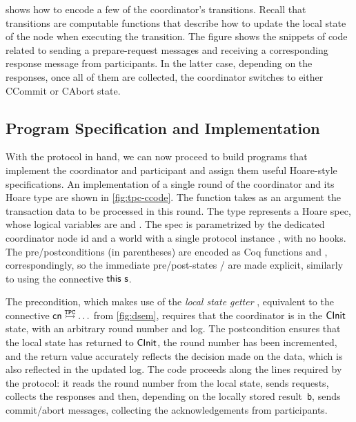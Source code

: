  shows how to encode a few of the
coordinator's transitions.
%
Recall that \disel transitions are computable functions that describe
how to update the local state of the node when executing the
transition.
%
The figure shows the snippets of \disel code related to sending a
prepare-request messages and receiving a corresponding response
message from participants.
%
In the latter case, depending on the responses, once all of them are
collected, the coordinator switches to either \textsf{CCommit} or
\textsf{CAbort} state.


\subsection{Program Specification and Implementation}
\label{sec:tpc-impl}

With the protocol in hand, we can now proceed to build programs that
implement the coordinator and participant and assign them useful
Hoare-style specifications.
%
An implementation of a single round of the coordinator and its Hoare
type are shown in \cref{fig:tpc-ccode}.
%
The function  takes as an argument the
transaction data to be processed in this round.
%
The type  represents a Hoare
spec, whose logical variables are  and . The spec is
parametrized by the dedicated coordinator node id  and a
world with a single protocol instance , with no hooks.
%
The pre/postconditions (in parentheses) are encoded as Coq functions
 and , correspondingly, so
the immediate pre/post-states / are made explicit,
similarly to using the connective $\mathsf{this}~{\mathsf{s}}$.

The precondition, which makes use of the \emph{local state getter}
, equivalent to the connective
$\mathsf{cn} \ppts{\mathtt{TPC}} \ldots$ from \cref{fig:dsem},
requires that the coordinator is in the $\mathsf{CInit}$ state, with an
arbitrary round number and log.
%
The postcondition ensures that the local state has returned to
$\mathsf{CInit}$, the round number has been incremented, and the return value
accurately reflects the decision made on the data, which is also
reflected in the updated log.
%
The code proceeds along the lines required by the protocol: it reads
the round number from the local state, sends requests, collects the
responses and then, depending on the locally stored result~\texttt{b},
sends commit/abort messages, collecting the acknowledgements from
participants.


